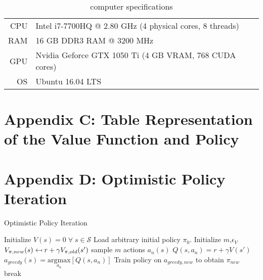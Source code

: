 \begin{table}[h]
	\begin{center}
		\begin{tabular}{r|l}
			CPU & Intel i7-7700HQ @ 2.80 GHz (4 physical cores, 8 threads) \\
			RAM\nomenclature[A]{RAM}{random access memory} & 16 GB DDR3 RAM @ 3200 MHz \\
			GPU & Nvidia Geforce GTX 1050 Ti (4 GB VRAM, 768 CUDA cores) \\
			OS & Ubuntu 16.04 LTS
		\end{tabular}
	\caption{computer specifications}
	\label{tab:pc_specs}
	\end{center}
\end{table}

\chapter{Appendix C: Table Representation of the Value Function and Policy}
\label{appendix_C}

\chapter{Appendix D: Optimistic Policy Iteration}
\label{appendix_D}

\begin{algorithm}
	\caption{Optimistic Policy Iteration}
	\begin{algorithmic}[0] %
		\State
		\State Initialize $V(s) = 0 \; \forall \; s \in \mathcal{S}$
		\State Load arbitrary initial policy $\pi_0$.
		\State Initialize $m$,$\epsilon_V$
		\State
		\State $V_{\pi,new}(s) \mathrel{\reflectbox{\ensuremath{\mapsto}}} r+\gamma V_ {\pi,old}(s')$
		\EndFor
		\EndFunction
		\State
		\State sample $m$ actions $a_n(s)$
		\State $Q(s,a_n) = r + \gamma V(s')$
		\EndFor
		\State $a_{greedy}(s)=\underset{a_n}{\text{argmax}}[Q(s,a_n)]$
		\EndFor
		\EndFunction
			\State Train policy on $a_{greedy,new}$ to obtain $\pi_{new}$
		\State
		\State break
		\EndIf	
		\EndWhile
		\State
		\EndFunction
	\end{algorithmic}
	\label{algo:opi}
\end{algorithm}

